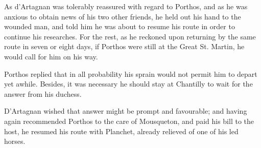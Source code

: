 As d'Artagnan was tolerably reassured with regard to Porthos, and as he was anxious to obtain news of his two other friends, he held out his hand to the wounded man, and told him he was about to resume his route in order to continue his researches. For the rest, as he reckoned upon returning by the same route in seven or eight days, if Porthos were still at the Great St. Martin, he would call for him on his way. 

Porthos replied that in all probability his sprain would not permit him to depart yet awhile. Besides, it was necessary he should stay at Chantilly to wait for the answer from his duchess. 

D'Artagnan wished that answer might be prompt and favourable; and having again recommended Porthos to the care of Mousqueton, and paid his bill to the host, he resumed his route with Planchet, already relieved of one of his led horses.